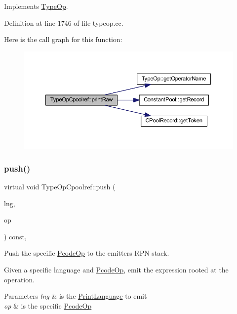 Implements \mbox{\hyperlink{class_type_op_a60717e486917a30cc7cb6e3ce02585e1}{Type\+Op}}.



Definition at line 1746 of file typeop.\+cc.

Here is the call graph for this function\+:
\nopagebreak
\begin{figure}[H]
\begin{center}
\leavevmode
\includegraphics[width=350pt]{class_type_op_cpoolref_a3368bf134c942c37c4c3080b82b069f6_cgraph}
\end{center}
\end{figure}
\mbox{\label{class_type_op_cpoolref_a595f39446ffc5411594a13318baf64b5}} 
\subsubsection{\texorpdfstring{push()}{push()}}
{\footnotesize\ttfamily virtual void Type\+Op\+Cpoolref\+::push (\begin{DoxyParamCaption}\item[{\mbox{\hyperlink{class_print_language}{Print\+Language}} $\ast$}]{lng,  }\item[{const \mbox{\hyperlink{class_pcode_op}{Pcode\+Op}} $\ast$}]{op }\end{DoxyParamCaption}) const\hspace{0.3cm}{\ttfamily [inline]}, {\ttfamily [virtual]}}



Push the specific \mbox{\hyperlink{class_pcode_op}{Pcode\+Op}} to the emitter\textquotesingle{}s R\+PN stack. 

Given a specific language and \mbox{\hyperlink{class_pcode_op}{Pcode\+Op}}, emit the expression rooted at the operation. 
\begin{DoxyParams}{Parameters}
{\em lng} & is the \mbox{\hyperlink{class_print_language}{Print\+Language}} to emit \\
\hline
{\em op} & is the specific \mbox{\hyperlink{class_pcode_op}{Pcode\+Op}} \\
\hline
\end{DoxyParams}


